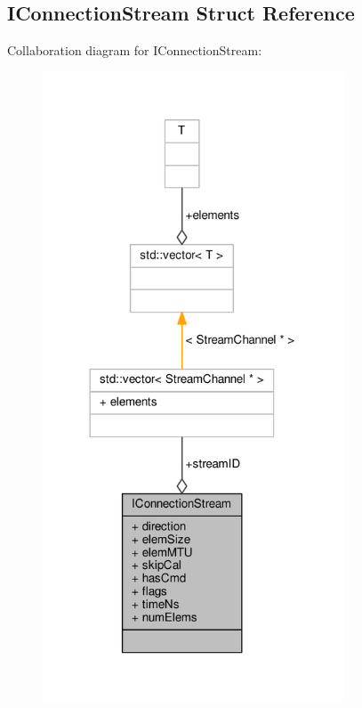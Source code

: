 \subsection{I\+Connection\+Stream Struct Reference}
\label{structIConnectionStream}


Collaboration diagram for I\+Connection\+Stream\+:
\nopagebreak
\begin{figure}[H]
\begin{center}
\leavevmode
\includegraphics[width=254pt]{d7/db3/structIConnectionStream__coll__graph}
\end{center}
\end{figure}
